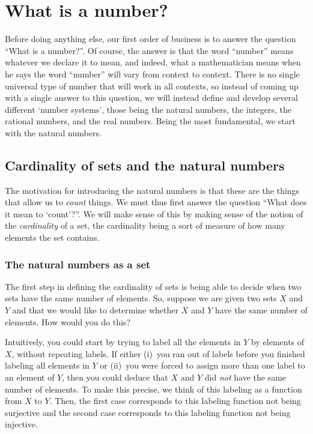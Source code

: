 \chapter{What is a number?}\label{chp1}

Before doing anything else, our first order of business is to answer the question ``What is a number?''.  Of course, the answer is that the word ``number'' means whatever we declare it to mean, and indeed, what a mathematician means when he says the word ``number'' will vary from context to context.  There is no single universal type of number that will work in all contexts, so instead of coming up with a single answer to this question, we will instead define and develop several different `number systems', those being the natural numbers, the integers, the rational numbers, and the real numbers.  Being the most fundamental, we start with the natural numbers.

\section{Cardinality of sets and the natural numbers}\label{sct1.1}

The motivation for introducing the natural numbers is that these are the things that allow us to \emph{count} things.  We must thus first answer the question ``What does it mean to `count'?''.  We will make sense of this by making sense of the notion of the \emph{cardinality} of a set, the cardinality being a sort of measure of how many elements the set contains.

\subsection{The natural numbers as a set}\label{sbs1.1.1}

The first step in defining the cardinality of sets is being able to decide when two sets have the same number of elements.  So, suppose we are given two sets $X$ and $Y$ and that we would like to determine whether $X$ and $Y$ have the same number of elements.  How would you do this?

Intuitively, you could start by trying to label all the elements in $Y$ by elements of $X$, without repeating labels.  If either (i)~you ran out of labels before you finished labeling all elements in $Y$ or (ii)~you were forced to assign more than one label to an element of $Y$, then you could deduce that $X$ and $Y$ did \emph{not} have the same number of elements.  To make this precise, we think of this labeling as a function from $X$ to $Y$.  Then, the first case corresponds to this labeling function not being surjective and the second case corresponds to this labeling function not being injective.

